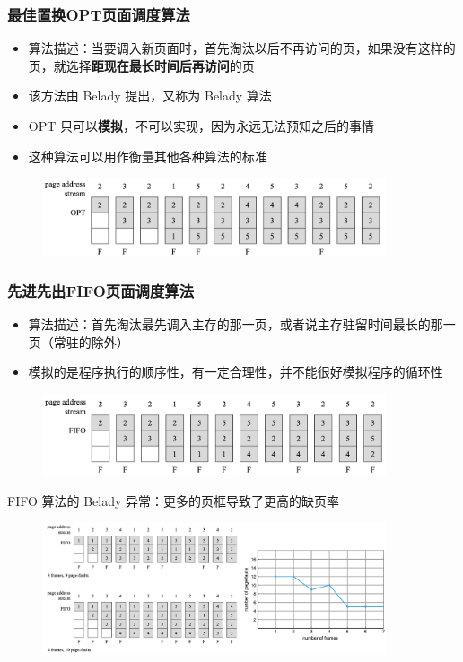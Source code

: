 \documentclass[cs4size,a4paper,10pt]{ctexart}
\begin{document}
		\subsubsection{最佳置换OPT页面调度算法}
		\begin{itemize}
			\item 算法描述：当要调入新页面时，首先淘汰以后不再访问的页，如果没有这样的页，就选择\textbf{距现在最长时间后再访问}的页
			\item 该方法由 Belady 提出，又称为 Belady 算法
			\item OPT 只可以\textbf{模拟}，不可以实现，因为永远无法预知之后的事情
			\item 这种算法可以用作衡量其他各种算法的标准
		\end{itemize}
		\begin{figure}[H]
			\centering
			\includegraphics[width=0.9\textwidth]{img/OPT}
		\end{figure}

		\subsubsection{先进先出FIFO页面调度算法}
		\begin{itemize}
			\item 算法描述：首先淘汰最先调入主存的那一页，或者说主存驻留时间最长的那一页（常驻的除外）
			\item 模拟的是程序执行的顺序性，有一定合理性，并不能很好模拟程序的循环性
		\end{itemize}
		\begin{figure}[H]
			\centering
			\includegraphics[width=0.9\textwidth]{img/FIFO}
		\end{figure}
		FIFO 算法的 Belady 异常：更多的页框导致了更高的缺页率
		\begin{figure}[H]
			\centering
			\includegraphics[width=0.9\textwidth]{img/Belady异常}
		\end{figure}
\end{document}
